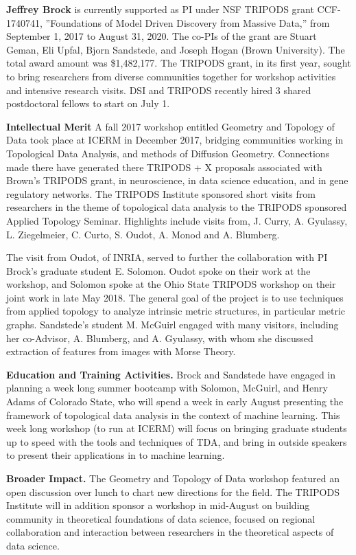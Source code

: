 

\textbf{Jeffrey Brock} is currently supported as PI under NSF TRIPODS grant CCF-1740741, ''Foundations of Model Driven Discovery from Massive Data,'' from September 1, 2017 to August 31, 2020. The co-PIs of the grant are Stuart Geman, Eli Upfal, Bjorn Sandstede, and Joseph Hogan (Brown University). The total award amount was \$1,482,177. The TRIPODS grant, in its first year, sought to bring researchers from diverse communities together for workshop activities and intensive research visits. DSI and TRIPODS recently hired 3 shared postdoctoral fellows to start on July 1.

\textbf{Intellectual Merit} A fall 2017 workshop entitled Geometry and Topology of Data took place at ICERM in December 2017, bridging communities working in Topological Data Analysis, and methods of Diffusion Geometry. Connections made there have generated there TRIPODS + X proposals associated with Brown's TRIPODS grant, in neuroscience, in data science education, and in gene regulatory networks. 
The TRIPODS Institute sponsored short visits from researchers in the theme of topological data analysis to the TRIPODS sponsored Applied Topology Seminar. Highlights include visits from, J. Curry, A. Gyulassy, L. Ziegelmeier, C. Curto, S. Oudot, A. Monod and A. Blumberg.

The visit from Oudot, of INRIA, served to further the collaboration with PI Brock's graduate student E. Solomon. Oudot spoke on their work at the workshop, and Solomon spoke at the Ohio State TRIPODS workshop on their joint work  \citep{Oudot:Solomon:persistence} in late May 2018. The general goal of the project is to use techniques from applied topology to analyze intrinsic metric structures, in particular metric graphs. Sandstede's student M. McGuirl engaged with many visitors, including her co-Advisor, A. Blumberg, and A. Gyulassy, with whom she discussed extraction of features from images with Morse Theory. 

{\bf Education and Training Activities.}
Brock and Sandstede have engaged in planning a week long summer bootcamp with Solomon, McGuirl, and Henry Adams of Colorado State, who will spend a week in early August presenting the framework of topological data analysis in the context of machine learning. This week long workshop (to run at ICERM) will focus on bringing graduate students up to speed with the tools and techniques of TDA, and bring in outside speakers to present their applications in to machine learning.

{\bf Broader Impact.} The Geometry and Topology of Data workshop featured an open discussion over lunch to chart new directions for the field. The TRIPODS Institute will in addition sponsor a workshop in mid-August on building community in theoretical foundations of data science, focused on regional collaboration and interaction between researchers in the theoretical aspects of data science.
